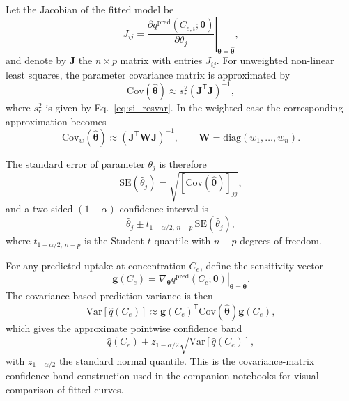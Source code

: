 \documentclass[journal=jacsat,manuscript=article]{achemso}
\begin{document}
Let the Jacobian of the fitted model be
\begin{equation}
	J_{ij}
	=
	\left.
	\frac{\partial q^{\mathrm{pred}}(C_{e,i};\boldsymbol{\theta})}
	{\partial \theta_j}
	\right|_{\boldsymbol{\theta}=\hat{\boldsymbol{\theta}}},
	\label{eq:si_Jacobian}
\end{equation}
and denote by $\mathbf{J}$ the $n \times p$ matrix with entries
$J_{ij}$. For unweighted non-linear least squares, the parameter
covariance matrix is approximated by
\begin{equation}
	\mathrm{Cov}(\hat{\boldsymbol{\theta}})
	\approx
	s_r^2 (\mathbf{J}^{\mathsf{T}}\mathbf{J})^{-1},
	\label{eq:si_cov_theta}
\end{equation}
where $s_r^2$ is given by Eq.~\eqref{eq:si_resvar}. In the weighted case
the corresponding approximation becomes
\begin{equation}
	\mathrm{Cov}_w(\hat{\boldsymbol{\theta}})
	\approx
	(\mathbf{J}^{\mathsf{T}}\mathbf{W}\mathbf{J})^{-1},
	\qquad
	\mathbf{W} = \mathrm{diag}(w_1,\dots,w_n).
	\label{eq:si_cov_theta_weighted}
\end{equation}

The standard error of parameter $\theta_j$ is therefore
\begin{equation}
	\mathrm{SE}(\hat{\theta}_j)
	=
	\sqrt{\left[\mathrm{Cov}(\hat{\boldsymbol{\theta}})\right]_{jj}},
	\label{eq:si_SE_theta}
\end{equation}
and a two-sided $(1-\alpha)$ confidence interval is
\begin{equation}
	\hat{\theta}_j
	\pm
	t_{1-\alpha/2,\,n-p}\,
	\mathrm{SE}(\hat{\theta}_j),
	\label{eq:si_CI_theta}
\end{equation}
where $t_{1-\alpha/2,\,n-p}$ is the Student-$t$ quantile with
$n-p$ degrees of freedom.

For any predicted uptake at concentration $C_e$, define the sensitivity
vector
\begin{equation}
	\mathbf{g}(C_e)
	=
	\left.
	\nabla_{\boldsymbol{\theta}}
	q^{\mathrm{pred}}(C_e;\boldsymbol{\theta})
	\right|_{\boldsymbol{\theta}=\hat{\boldsymbol{\theta}}}.
	\label{eq:si_prediction_gradient}
\end{equation}
The covariance-based prediction variance is then
\begin{equation}
	\mathrm{Var}\!\left[\hat{q}(C_e)\right]
	\approx
	\mathbf{g}(C_e)^{\mathsf{T}}
	\mathrm{Cov}(\hat{\boldsymbol{\theta}})
	\mathbf{g}(C_e),
	\label{eq:si_prediction_var}
\end{equation}
which gives the approximate pointwise confidence band
\begin{equation}
	\hat{q}(C_e)
	\pm
	z_{1-\alpha/2}
	\sqrt{\mathrm{Var}\!\left[\hat{q}(C_e)\right]},
	\label{eq:si_confband}
\end{equation}
with $z_{1-\alpha/2}$ the standard normal quantile. This is the
covariance-matrix confidence-band construction used in the companion
notebooks for visual comparison of fitted curves.
\end{document}
